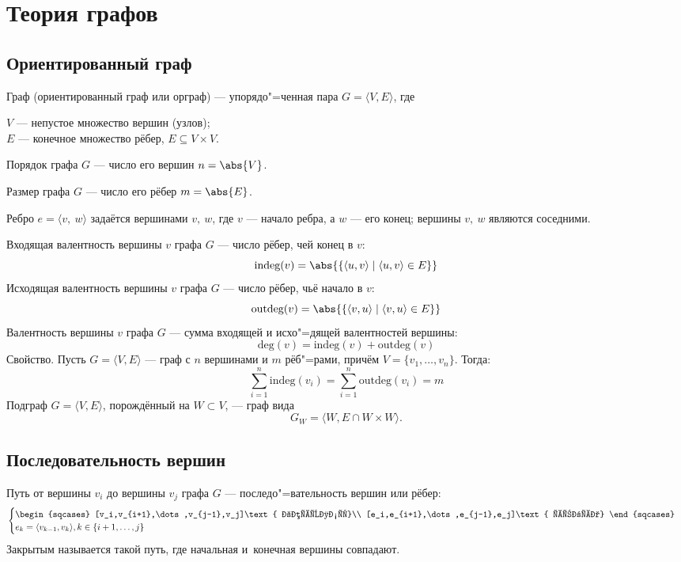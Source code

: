 \section{Теория графов}

\subsection{Ориентированный граф}

{\bold Граф} {\ital (ориентированный граф или орграф)} --- упорядо"=ченная пара $G=\langle V,E\rangle$, где

$V$ --- непустое множество {\ital вершин {\color{desc}(узлов)}};\\
$E$ --- конечное множество {\ital рёбер}, $E\subseteq V\times V$.

{\ital Порядок} графа $G$ --- число его вершин $n=\abs{V}$.

{\ital Размер} графа $G$ --- число его рёбер $m=\abs{E}$.

Ребро $e=\langle v,\ w\rangle$ задаётся вершинами $v,\ w$, где $v$ --- начало ребра, а $w$ --- его конец; вершины $v,\ w$ являются {\ital соседними}.

{\ital Входящая валентность} вершины $v$ графа $G$ --- число рёбер, чей конец в $v$:
$$\text{indeg}(v)=\abs{\{\langle u,v\rangle\mid\langle u,v\rangle\in E\}}$$
{\ital Исходящая валентность} вершины $v$ графа $G$ --- число рёбер, чьё начало в $v$:
$$\text{outdeg}(v)=\abs{\{\langle v,u\rangle\mid\langle v,u\rangle\in E\}}$$
{\ital Валентность} вершины $v$ графа $G$ --- сумма входящей и исхо"=дящей валентностей вершины:
$$\text{deg}(v)=\text{indeg}(v)+\text{outdeg}(v)$$
{\ital Свойство.} Пусть $G=\langle V,E\rangle$ --- граф с $n$ вершинами и $m$ рёб"=рами, причём $V=\{v_1,\dots,v_n\}$. Тогда:
$$\sum_{i=1}^{n}\text{indeg}(v_i)=\sum_{i=1}^{n}\text{outdeg}(v_i)=m$$
{\ital Подграф} $G=\langle V,E\rangle$, {\ital порождённый} на $W\subset V$, --- граф вида
$$G_W=\langle W,E\cap W\times W\rangle.$$

\newpage
\subsection{Последовательность вершин}

{\bold Путь} от вершины $v_i$ до вершины $v_j$ графа $G$ --- последо"=вательность вершин или рёбер:
$$\begin{cases}
\begin{sqcases}
[v_i,v_{i+1},\dots,v_{j-1},v_j]\text{ вершины}\\
[e_i,e_{i+1},\dots,e_{j-1},e_j]\text{ рёбра}
\end{sqcases}\\
e_k=\langle v_{k-1},v_k\rangle,k\in\{i+1,\dots,j\}
\end{cases}$$
{\bold Закрытым} называется такой путь, где начальная и~конечная вершины совпадают.

